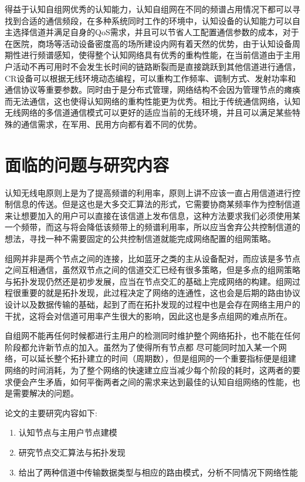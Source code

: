 \documentclass[a4paper,AutoFakeBold,oneside,12pt]{book}
\begin{document}
  得益于认知自组网优秀的认知能力，认知自组网在不同的频谱占用情况下都可以寻找到合适的通信频段，在多种系统同时工作的环境中，认知设备的认知能力可以自主选择信道并满足自身的QoS需求，并且可以节省人工配置通信参数的成本，对于在医院，商场等活动设备密度高的场所建设内网有着天然的优势，由于认知设备周期性进行频谱感知，使得整个认知网络具有优秀的重构性能，在当前信道由于主用户活动不再可用时不会发生长时间的链路断裂而是直接跳跃到其他信道进行通信，CR设备可以根据无线环境动态编程，可以重构工作频率、调制方式、发射功率和通信协议等重要参数。同时由于是分布式管理，网络结构不会因为管理节点的瘫痪而无法通信，这也使得认知网络的重构性能更为优秀。相比于传统通信网络，认知无线网络的多信道通信模式可以更好的适应当前的无线环境，并且可以满足某些特殊的通信需求，在军用、民用方向都有着不同的优势。

\section{面临的问题与研究内容}
  认知无线电原则上是为了提高频谱的利用率，原则上讲不应该一直占用信道进行控制信息的传送。但是这也是大多交汇算法的形式，它需要协商某频率作为控制信道来让想要加入的用户可以直接在该信道上发布信息，这种方法要求我们必须使用某一个频带，而这与将会降低该频带上的频谱利用率，所以应当舍弃公共控制信道的想法，寻找一种不需要固定的公共控制信道就能完成网络配置的组网策略。

  组网并非是两个节点之间的连接，比如蓝牙之类的主从设备配对，而应该是多节点之间互相通信，虽然双节点之间的信道交汇已经有很多策略，但是多点的组网策略与拓扑发现仍然还是初步发展，应当在节点交汇的基础上完成网络的构建。组网过程很重要的就是拓扑发现，此过程决定了网络的连通性，这也会是后期的路由协议设计以及数据传输的基础，起到了而在拓扑发现的过程中也是会存在网络主用户的干扰，这将会对信道可用率产生很大的影响，因此这也是多点组网的难点所在。
 
 自组网不能再任何时候都进行主用户的检测同时维护整个网络拓扑，也不能在任何阶段都允许新节点的加入。虽然为了使得所有节点都 尽可能同时加入某一个网络，可以延长整个拓扑建立的时间（周期数），但是组网的一个重要指标便是组建网络的时间消耗，为了整个网络的快速建立应当减少每个阶段的耗时，这两者的要求便会产生矛盾，如何平衡两者之间的需求来达到最佳的认知自组网络的性能，也是需要解决的问题。

    论文的主要研究内容如下:
\begin{enumerate}[\indent (1)] %
\item 认知节点与主用户节点建模
\item  研究节点交汇算法与拓扑发现
\item  给出了两种信道中传输数据类型与相应的路由模式，分析不同情况下网络性能
\end{enumerate}
\end{document}
